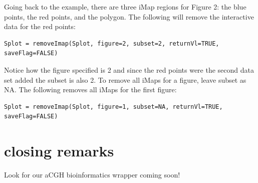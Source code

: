 \documentclass[]{article}
\begin{document}
\indent Going back to the example, there are three iMap regions for Figure 2: the blue points, the red points, and the polygon. The following will remove the interactive data for the red points: 



\begin{verbatim}
Splot = removeImap(Splot, figure=2, subset=2, returnVl=TRUE, saveFlag=FALSE)
\end{verbatim}

Notice how the figure specified is 2 and since the red points were the second data set added the subset is also 2. To remove all iMaps for a figure, leave subset as NA. The following removes all iMaps for the first figure:




\begin{verbatim}
Splot = removeImap(Splot, figure=1, subset=NA, returnVl=TRUE, saveFlag=FALSE)
\end{verbatim}


\section{closing remarks}


Look for our aCGH bioinformatics wrapper coming soon!
\end{document}
